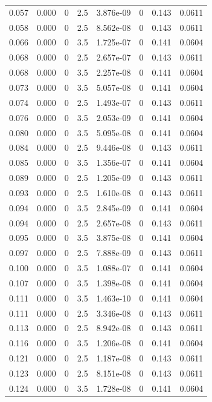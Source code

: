 \documentclass[preview]{standalone}
\begin{document}
{{\begin{tabular}{L{1.2cm}C{1.2cm} C{0.3cm}C{0.5cm} C{1.4cm}C{1.4cm} C{1.4cm}C{1.4cm}}
  0.057  &  0.000  & 0     & 2.5 &  3.876e-09  & 0  & 0.143 &  0.0611   \\ 
  0.058  &  0.000  & 0     & 2.5 &  8.562e-08  & 0  & 0.143 &  0.0611   \\ 
  0.066  &  0.000  & 0     & 3.5 &  1.725e-07  & 0  & 0.141 &  0.0604   \\ 
  0.068  &  0.000  & 0     & 2.5 &  2.657e-07  & 0  & 0.143 &  0.0611   \\ 
  0.068  &  0.000  & 0     & 3.5 &  2.257e-08  & 0  & 0.141 &  0.0604   \\ 
  0.073  &  0.000  & 0     & 3.5 &  5.057e-08  & 0  & 0.141 &  0.0604   \\ 
  0.074  &  0.000  & 0     & 2.5 &  1.493e-07  & 0  & 0.143 &  0.0611   \\ 
  0.076  &  0.000  & 0     & 3.5 &  2.053e-09  & 0  & 0.141 &  0.0604   \\ 
  0.080  &  0.000  & 0     & 3.5 &  5.095e-08  & 0  & 0.141 &  0.0604   \\ 
  0.084  &  0.000  & 0     & 2.5 &  9.446e-08  & 0  & 0.143 &  0.0611   \\ 
  0.085  &  0.000  & 0     & 3.5 &  1.356e-07  & 0  & 0.141 &  0.0604   \\ 
  0.089  &  0.000  & 0     & 2.5 &  1.205e-09  & 0  & 0.143 &  0.0611   \\ 
  0.093  &  0.000  & 0     & 2.5 &  1.610e-08  & 0  & 0.143 &  0.0611   \\ 
  0.094  &  0.000  & 0     & 3.5 &  2.845e-09  & 0  & 0.141 &  0.0604   \\ 
  0.094  &  0.000  & 0     & 2.5 &  2.657e-08  & 0  & 0.143 &  0.0611   \\ 
  0.095  &  0.000  & 0     & 3.5 &  3.875e-08  & 0  & 0.141 &  0.0604   \\ 
  0.097  &  0.000  & 0     & 2.5 &  7.888e-09  & 0  & 0.143 &  0.0611   \\ 
  0.100  &  0.000  & 0     & 3.5 &  1.088e-07  & 0  & 0.141 &  0.0604   \\ 
  0.107  &  0.000  & 0     & 3.5 &  1.398e-08  & 0  & 0.141 &  0.0604   \\ 
  0.111  &  0.000  & 0     & 3.5 &  1.463e-10  & 0  & 0.141 &  0.0604   \\ 
  0.111  &  0.000  & 0     & 2.5 &  3.346e-08  & 0  & 0.143 &  0.0611   \\ 
  0.113  &  0.000  & 0     & 2.5 &  8.942e-08  & 0  & 0.143 &  0.0611   \\ 
  0.116  &  0.000  & 0     & 3.5 &  1.206e-08  & 0  & 0.141 &  0.0604   \\ 
  0.121  &  0.000  & 0     & 2.5 &  1.187e-08  & 0  & 0.143 &  0.0611   \\ 
  0.123  &  0.000  & 0     & 2.5 &  8.151e-08  & 0  & 0.143 &  0.0611   \\ 
  0.124  &  0.000  & 0     & 3.5 &  1.728e-08  & 0  & 0.141 &  0.0604   \\ 
\hline 
\end{tabular} 

}}
\end{document}
